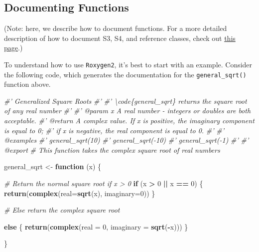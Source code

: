 \documentclass[]{book}
\newenvironment{Shaded}{\begin{snugshade}}{\end{snugshade}}
\newcommand{\KeywordTok}[1]{\textcolor[rgb]{0.13,0.29,0.53}{\textbf{#1}}}
\newcommand{\DataTypeTok}[1]{\textcolor[rgb]{0.13,0.29,0.53}{#1}}
\newcommand{\DecValTok}[1]{\textcolor[rgb]{0.00,0.00,0.81}{#1}}
\newcommand{\StringTok}[1]{\textcolor[rgb]{0.31,0.60,0.02}{#1}}
\newcommand{\CommentTok}[1]{\textcolor[rgb]{0.56,0.35,0.01}{\textit{#1}}}
\newcommand{\ControlFlowTok}[1]{\textcolor[rgb]{0.13,0.29,0.53}{\textbf{#1}}}
\newcommand{\OperatorTok}[1]{\textcolor[rgb]{0.81,0.36,0.00}{\textbf{#1}}}
\newcommand{\NormalTok}[1]{#1}
\begin{document}
\subsection{Documenting Functions}\label{documenting-functions}

(Note: here, we describe how to document functions. For a more detailed
description of how to document S3, S4, and reference classes, check out
\href{http://r-pkgs.had.co.nz/man.html}{this page}.)

To understand how to use \texttt{Roxygen2}, it's best to start with an
example. Consider the following code, which generates the documentation
for the \texttt{general\_sqrt()} function above.

\begin{Shaded}
\begin{Highlighting}[]
\CommentTok{#' Generalized Square Roots}
\CommentTok{#'}
\CommentTok{#' \textbackslash{}code\{general_sqrt\} returns the square root of any real number}
\CommentTok{#'}
\CommentTok{#' @param x A real number - integers or doubles are both acceptable.}
\CommentTok{#' @return A complex value. If x is positive, the imaginary component is equal to 0;}
\CommentTok{#' if x is negative, the real component is equal to 0.}
\CommentTok{#'}
\CommentTok{#' @examples}
\CommentTok{#' general_sqrt(10)}
\CommentTok{#' general_sqrt(-10)}
\CommentTok{#' general_sqrt(-1)}
\CommentTok{#'}
\CommentTok{#' @export}
\CommentTok{# This function takes the complex square root of real numbers}

\NormalTok{general_sqrt <-}\StringTok{ }\ControlFlowTok{function}\NormalTok{ (x) \{}

  \CommentTok{# Return the normal square root if x > 0}
  \ControlFlowTok{if}\NormalTok{ (x }\OperatorTok{>}\StringTok{ }\DecValTok{0} \OperatorTok{||}\StringTok{ }\NormalTok{x }\OperatorTok{==}\StringTok{ }\DecValTok{0}\NormalTok{) \{}
    \KeywordTok{return}\NormalTok{(}\KeywordTok{complex}\NormalTok{(}\DataTypeTok{real=}\KeywordTok{sqrt}\NormalTok{(x), }\DataTypeTok{imaginary=}\DecValTok{0}\NormalTok{))}
\NormalTok{  \}}

  \CommentTok{# Else return the complex square root}

  \ControlFlowTok{else}\NormalTok{ \{}
    \KeywordTok{return}\NormalTok{(}\KeywordTok{complex}\NormalTok{(}\DataTypeTok{real =} \DecValTok{0}\NormalTok{, }\DataTypeTok{imaginary =} \KeywordTok{sqrt}\NormalTok{(}\OperatorTok{-}\NormalTok{x)))}
\NormalTok{  \}}

\NormalTok{\}}
\end{Highlighting}
\end{Shaded}
\end{document}
